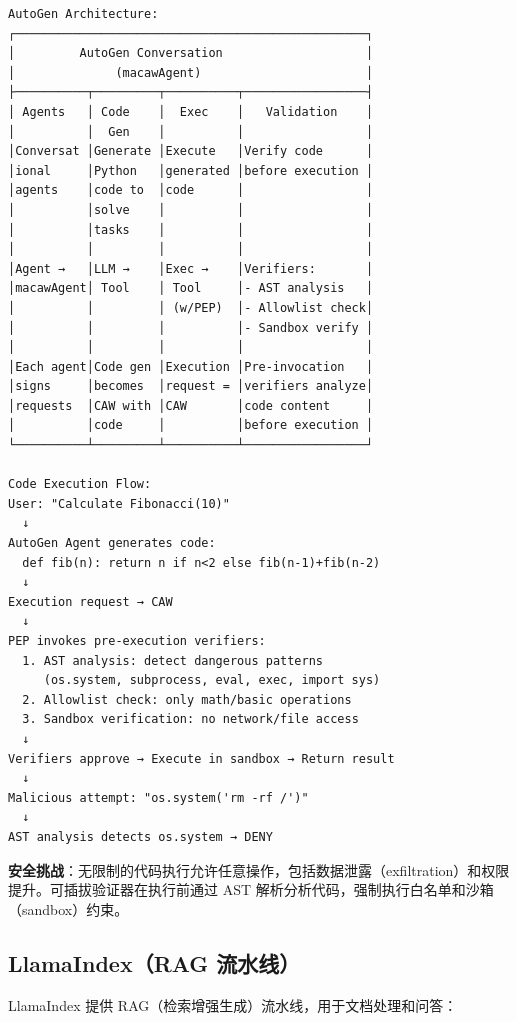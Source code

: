 {{\tiny
\begin{verbatim}
AutoGen Architecture:
┌─────────────────────────────────────────────────┐
│         AutoGen Conversation                    │
│              (macawAgent)                       │
├──────────┬─────────┬──────────┬─────────────────┤
│ Agents   │ Code    │  Exec    │   Validation    │
│          │  Gen    │          │                 │
│Conversat │Generate │Execute   │Verify code      │
│ional     │Python   │generated │before execution │
│agents    │code to  │code      │                 │
│          │solve    │          │                 │
│          │tasks    │          │                 │
│          │         │          │                 │
│Agent →   │LLM →    │Exec →    │Verifiers:       │
│macawAgent│ Tool    │ Tool     │- AST analysis   │
│          │         │ (w/PEP)  │- Allowlist check│
│          │         │          │- Sandbox verify │
│          │         │          │                 │
│Each agent│Code gen │Execution │Pre-invocation   │
│signs     │becomes  │request = │verifiers analyze│
│requests  │CAW with │CAW       │code content     │
│          │code     │          │before execution │
└──────────┴─────────┴──────────┴─────────────────┘

Code Execution Flow:
User: "Calculate Fibonacci(10)"
  ↓
AutoGen Agent generates code:
  def fib(n): return n if n<2 else fib(n-1)+fib(n-2)
  ↓
Execution request → CAW
  ↓
PEP invokes pre-execution verifiers:
  1. AST analysis: detect dangerous patterns
     (os.system, subprocess, eval, exec, import sys)
  2. Allowlist check: only math/basic operations
  3. Sandbox verification: no network/file access
  ↓
Verifiers approve → Execute in sandbox → Return result
  ↓
Malicious attempt: "os.system('rm -rf /')"
  ↓
AST analysis detects os.system → DENY
\end{verbatim}}

\textbf{安全挑战}：无限制的代码执行允许任意操作，包括数据泄露（exfiltration）和权限提升。可插拔验证器在执行前通过 AST 解析分析代码，强制执行白名单和沙箱（sandbox）约束。

\subsection*{LlamaIndex（RAG 流水线）}

LlamaIndex 提供 RAG（检索增强生成）流水线，用于文档处理和问答：

}
